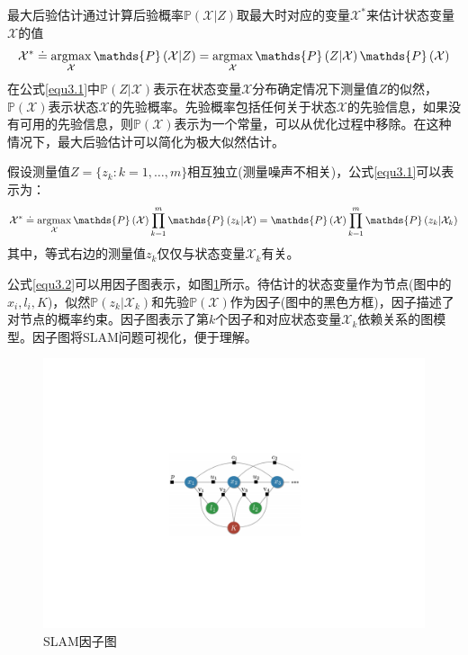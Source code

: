 最大后验估计通过计算后验概率$\mathds{P}\left(\mathcal{X} \vert Z\right)$取最大时对应的变量$\mathcal{X}^*$来估计状态变量$\mathcal{X}$的值
\begin{equation}
\label{equ3.1}
\mathcal{X}^* 
\doteq 
\argmax \limits_{\mathcal{X}} \mathds{P}\left(\mathcal{X} \vert Z\right) 
=
\argmax \limits_{\mathcal{X}}\mathds{P}\left(Z \vert \mathcal{X}  \right)\mathds{P}\left(\mathcal{X}\right)
\end{equation}
在公式\eqref{equ3.1}中$\mathds{P}\left(Z \vert \mathcal{X}  \right)$表示在状态变量$\mathcal{X}$分布确定情况下测量值$Z$的似然，$\mathds{P}\left(\mathcal{X}\right)$表示状态$\mathcal{X}$的先验概率。先验概率包括任何关于状态$\mathcal{X}$的先验信息，如果没有可用的先验信息，则$\mathds{P}\left(\mathcal{X}\right)$表示为一个常量，可以从优化过程中移除。在这种情况下，最大后验估计可以简化为极大似然估计。

假设测量值$Z=\lbrace z_k:k=1,\ldots ,m\rbrace$相互独立(测量噪声不相关)，公式\eqref{equ3.1}可以表示为：
\begin{equation}
\label{equ3.2}
\mathcal{X}^* 
\doteq 
\argmax \limits_{\mathcal{X}} \mathds{P}\left(\mathcal{X}\right) \prod \limits_{k=1}^{m} \mathds{P}\left(z_k \vert \mathcal{X}  \right)
=
\mathds{P}\left(\mathcal{X}\right) \prod \limits_{k=1}^{m} \mathds{P}\left(z_k \vert \mathcal{X}_k  \right)
\end{equation}
其中，等式右边的测量值$z_k$仅仅与状态变量$\mathcal{X}_k$有关。

公式\eqref{equ3.2}可以用因子图\upcite{[3.3]}表示，如图\ref{fig3.3}所示。待估计的状态变量作为节点(图中的$x_i,l_i,K$)，似然$\mathds{P}\left(z_k \vert \mathcal{X}_k  \right)$和先验$\mathds{P}\left(\mathcal{X} \right)$作为因子(图中的黑色方框)，因子描述了对节点的概率约束。因子图表示了第$k$个因子和对应状态变量$\mathcal{X}_k$依赖关系的图模型。因子图将SLAM问题可视化，便于理解。

\begin{figure}
\centering
\includegraphics[scale=0.5,angle=-90]{figures/Fig3-3.pdf}
\caption{SLAM因子图}
\label{fig3.3}
\end{figure}


